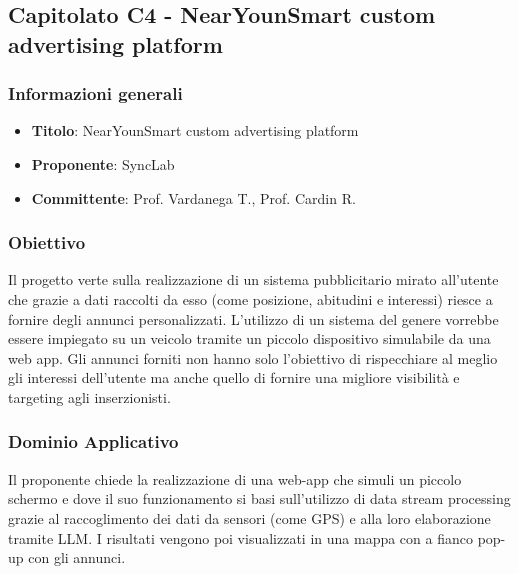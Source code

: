 \subsection{Capitolato C4 - NearYounSmart custom advertising platform}
     \subsubsection{Informazioni generali}
        \begin{itemize}
            \item \textbf{Titolo}: NearYounSmart custom advertising platform
            \item \textbf{Proponente}: SyncLab
            \item \textbf{Committente}: Prof. Vardanega T., Prof. Cardin R.
        \end{itemize}
     \subsubsection{Obiettivo}
    Il progetto verte sulla realizzazione di un sistema pubblicitario mirato all’utente che grazie a dati raccolti da esso (come posizione, abitudini e interessi) riesce a fornire degli annunci personalizzati. L’utilizzo di un sistema del genere vorrebbe essere impiegato su un veicolo tramite un piccolo dispositivo simulabile da una web app. Gli annunci forniti non hanno solo l'obiettivo di rispecchiare al meglio gli interessi dell’utente ma anche quello di fornire una migliore visibilità e targeting agli inserzionisti.
     \subsubsection{Dominio Applicativo}
    Il proponente chiede la realizzazione di una web-app che simuli un piccolo schermo e dove il suo funzionamento si basi sull’utilizzo di data stream processing grazie al raccoglimento dei dati da sensori (come GPS) e alla loro elaborazione tramite LLM. I risultati vengono poi visualizzati in una mappa con a fianco pop-up con gli annunci.
